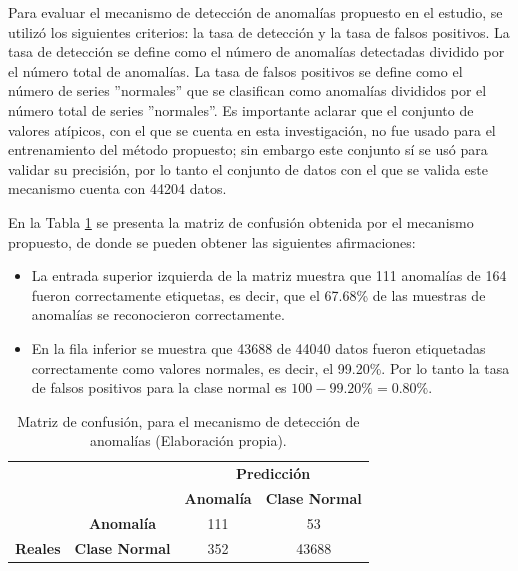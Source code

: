 Para evaluar el mecanismo de detecci\'{o}n de anomal\'{i}as propuesto en el estudio, se utiliz\'{o} los siguientes criterios: la tasa de detecci\'{o}n y la tasa de falsos positivos. La tasa de detección se define como el número de anomal\'{i}as detectadas dividido por el número total de anomal\'{i}as. La tasa de falsos positivos se define como el número de series ''normales'' que se clasifican como anomal\'{i}as divididos por el número total de series ''normales''. Es importante aclarar que el conjunto de valores at\'{i}picos, con el que se cuenta en esta investigaci\'{o}n, no fue usado para el entrenamiento del m\'{e}todo propuesto; sin embargo este conjunto s\'{i} se us\'{o} para validar su precisi\'{o}n, por lo tanto el conjunto de datos con el que se valida este mecanismo cuenta con 44204 datos.
 
\vspace{5mm} %

En la Tabla \ref{table:matriz_resultado} se presenta la matriz de confusi\'{o}n obtenida por el mecanismo propuesto, de donde se pueden obtener las siguientes afirmaciones:

\begin{itemize}
\item La entrada superior izquierda de la matriz muestra que 111 anomal\'{i}as de 164 fueron correctamente etiquetas, es decir, que el 67.68\% de las muestras de anomal\'{i}as se reconocieron correctamente.
\item En la fila inferior se muestra que 43688 de 44040 datos fueron etiquetadas correctamente como valores normales, es decir, el 99.20\%. Por lo tanto la tasa de falsos positivos para la clase normal es $100-99.20\% = 0.80\%$.
\end{itemize}

\begin{table}[H]

\centering
\begin{center}
\begin{tabular}{ll|c|c|}
\cline{3-4}
                                                        &                                              & \multicolumn{2}{c|}{\textbf{Predicci\'{o}n}}                                                          \\ \cline{3-4} 
                                                        &                                              & \textbf{Anomal\'{i}a}                         & \textbf{Clase Normal}                         \\ \hline
\multicolumn{1}{|c|}{}                                  & \multicolumn{1}{c|}{\textbf{Anomal\'{i}a}} & \cellcolor[HTML]{AADD99}111 & \cellcolor[HTML]{FFCE93}53 \\ \cline{2-4} 
\multicolumn{1}{|c|}{\multirow{-2}{*}{\textbf{Reales}}} & \multicolumn{1}{c|}{\textbf{Clase Normal}} & \cellcolor[HTML]{DF9F9F}352 & \cellcolor[HTML]{AADD99}43688 \\ \hline
\end{tabular}
\caption{Matriz de confusi\'{o}n, para el mecanismo de detecci\'{o}n de anomal\'{i}as (Elaboraci\'{o}n propia).}
\label{table:matriz_resultado}
\end{center}
\end{table}

